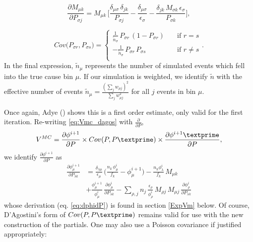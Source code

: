 \begin{equation}
	\frac{\partial M_{\mu k}}{\partial P_{\sigma j}} = 
	M_{\mu k}
  \, 
	\Bigg[
	\frac{\delta_{\mu \sigma} \, \delta_{jk}}{P_{\sigma j}}
	-\frac{\delta_{\mu \sigma}}{\epsilon_{\sigma}}
	-\frac{\delta_{jk} \, M_{\sigma k} \, \epsilon_{\sigma}}{P_{\sigma k}}
	\Bigg],
\end{equation}

\begin{equation} \label{eq:CovPP}
Cov \big( P_{\sigma r}, P_{\sigma s} \big) =
  \begin{cases}
  \frac{1}{\tilde{n}_{\sigma}} \, P_{\sigma r} \, (1-P_{\sigma r})       & \quad \text{if } r = s \\
    -\frac{1}{\tilde{n}_{\sigma}} \, P_{\sigma r} \, P_{\sigma s}        & \quad \text{if } r \ne s \\
  \end{cases}.
\end{equation}
In the final expression, $\tilde{n}_{\mu}$ represents the number of simulated events which fell into the true cause bin $\mu$. 
If our simulation is weighted, we identify $\tilde{n}$ with the effective number of events 
$\tilde{n}_{\mu} = \frac{( \sum_{j} w_{\mu j} )^{2}}{\sum_{j} w_{\mu j}^{2}}$ for all $j$ events in bin $\mu$.

Once again, Adye (\cite{adye2}) shows this is a first order estimate, only valid for the first iteration.
Re-writing \ref{eq:Vmc_dagos} with $\frac{\partial}{\partial P}$,
\begin{equation} \label{eq:Vmc_matrix}
	V^{MC} = 
	\frac{\partial \phi^{i+1}}{\partial P} \times
	Cov(P,P\textprime) \times
	\frac{\partial \phi^{i+1}\textprime}{\partial P},
\end{equation}
we identify $\frac{\partial \phi^{i+1}}{\partial P}$ as
\begin{equation*}
\begin{split}
	\frac{\partial \phi^{i+1}_{\mu}}{\partial P_{\lambda k}}
	&= \frac{\delta_{\lambda \mu}}{\epsilon_{\mu}} \, \bigg(\frac { n_{k} \, \phi^{i}_{\mu} }{ f_{k}} - \phi^{i+1}_{\mu} \bigg)
	- \frac{n_{k} \phi^{i}_{\lambda} }{f_{k}} \, M_{\mu k} \\
	&
	+ \frac{\phi^{i+1}_{\mu}}{\phi^{i}_{\mu}} \, \frac{\partial \phi^{i}_{\mu}}{\partial P_{\lambda k}} 
	- \sum_{\rho,j}{ n_{j} \, \frac{\epsilon_{\rho}}{\phi^{i}_{\rho}} \, M_{\rho j} \, M_{\mu j} \, \frac{\partial \phi^{i}_{\rho}}{\partial P_{\lambda k}} }
\end{split}
\end{equation*}
whose derivation (eq. \ref{eq:dphidP}) is found in section \ref{ExpVm} below. 
Of course, D'Agostini's form of $Cov(P,P\textprime)$ remains valid for use with the new construction of the partials.
One may also use a Poisson covariance if justified appropriately:

